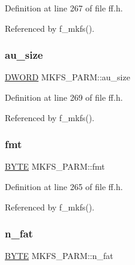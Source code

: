 Definition at line 267 of file ff.\+h.



Referenced by f\+\_\+mkfs().

\mbox{\label{structMKFS__PARM_adb29b0af8e486fc53d8b629c3e49d567}} 
\subsubsection{\texorpdfstring{au\+\_\+size}{au\_size}}
{\footnotesize\ttfamily \hyperlink{ff_8h_ad342ac907eb044443153a22f964bf0af}{D\+W\+O\+RD} M\+K\+F\+S\+\_\+\+P\+A\+R\+M\+::au\+\_\+size}



Definition at line 269 of file ff.\+h.



Referenced by f\+\_\+mkfs().

\mbox{\label{structMKFS__PARM_a54cb609ecff9f1586f3628b00aeb8f23}} 
\subsubsection{\texorpdfstring{fmt}{fmt}}
{\footnotesize\ttfamily \hyperlink{ff_8h_a4ae1dab0fb4b072a66584546209e7d58}{B\+Y\+TE} M\+K\+F\+S\+\_\+\+P\+A\+R\+M\+::fmt}



Definition at line 265 of file ff.\+h.



Referenced by f\+\_\+mkfs().

\mbox{\label{structMKFS__PARM_a0ff8e4728bddfe0636c50367af399e25}} 
\subsubsection{\texorpdfstring{n\+\_\+fat}{n\_fat}}
{\footnotesize\ttfamily \hyperlink{ff_8h_a4ae1dab0fb4b072a66584546209e7d58}{B\+Y\+TE} M\+K\+F\+S\+\_\+\+P\+A\+R\+M\+::n\+\_\+fat}



